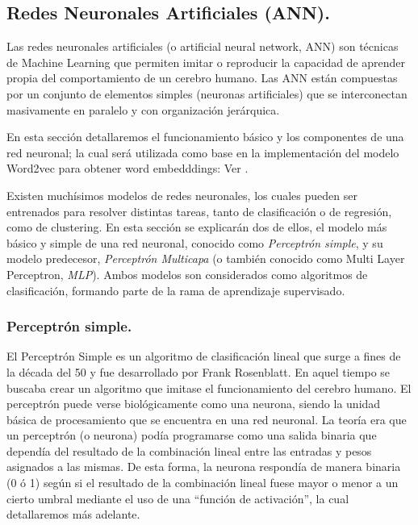 \documentclass[12pt,a4paper]{article}
\begin{document}
\begin{sloppypar}
\cleardoublepage
\subsection{Redes Neuronales Artificiales (ANN).}\label{ann_teoria}

Las redes neuronales artificiales (o artificial neural network, ANN) son técnicas de Machine Learning que permiten imitar o reproducir la capacidad de aprender propia del comportamiento de un cerebro humano. Las ANN están compuestas por un conjunto de elementos simples (neuronas artificiales) que se interconectan masivamente en paralelo y con organización jerárquica\cite{ANN_21}.

En esta sección detallaremos el funcionamiento básico y los componentes de una red neuronal; la cual será utilizada como base en la implementación del modelo Word2vec para obtener word embedddings: Ver \textit{}.

Existen muchísimos modelos de redes neuronales, los cuales pueden ser entrenados para resolver distintas tareas, tanto de clasificación o de regresión, como de clustering. En esta sección se explicarán dos de ellos, el modelo más básico y simple de una red neuronal, conocido como \textit{Perceptrón simple}, y su modelo predecesor, \textit{Perceptrón Multicapa} (o también conocido como Multi Layer Perceptron, \textit{MLP}). Ambos modelos son considerados como algoritmos de clasificación, formando parte de la rama de aprendizaje supervisado.

\subsubsection{Perceptrón simple.}

El Perceptrón Simple es un algoritmo de clasificación lineal que surge a fines de la década del 50 y fue desarrollado por Frank Rosenblatt. En aquel tiempo se buscaba crear un algoritmo que imitase el funcionamiento del cerebro humano. El perceptrón puede verse biológicamente como una neurona, siendo la unidad básica de procesamiento que se encuentra en una red neuronal. La teoría era que un perceptrón (o neurona) podía programarse como una salida binaria que dependía del resultado de la combinación lineal entre las entradas y pesos asignados a las mismas. De esta forma, la neurona respondía de manera binaria (0 ó 1) según si el resultado de la combinación lineal fuese mayor o menor a un cierto umbral mediante el uso de una “función de activación”\cite{apunte_uba}, la cual detallaremos más adelante.


\end{sloppypar}
\end{document}
